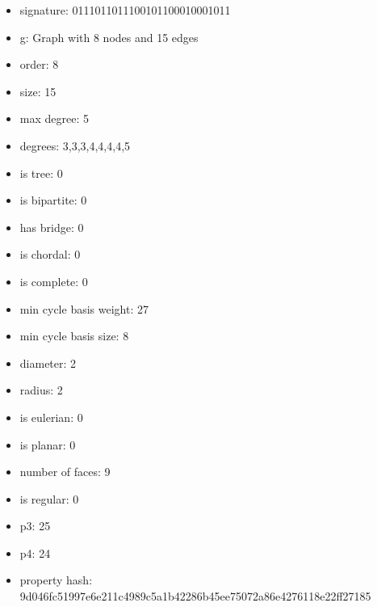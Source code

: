 \begin{itemize}
\item signature: 0111011011100101100010001011
\item g: Graph with 8 nodes and 15 edges
\item order: 8
\item size: 15
\item max degree: 5
\item degrees: 3,3,3,4,4,4,4,5
\item is tree: 0
\item is bipartite: 0
\item has bridge: 0
\item is chordal: 0
\item is complete: 0
\item min cycle basis weight: 27
\item min cycle basis size: 8
\item diameter: 2
\item radius: 2
\item is eulerian: 0
\item is planar: 0
\item number of faces: 9
\item is regular: 0
\item p3: 25
\item p4: 24
\item property hash: 9d046fc51997e6e211c4989c5a1b42286b45ee75072a86e4276118e22ff27185
\end{itemize}
\newpage
\begin{figure}
\end{figure}
